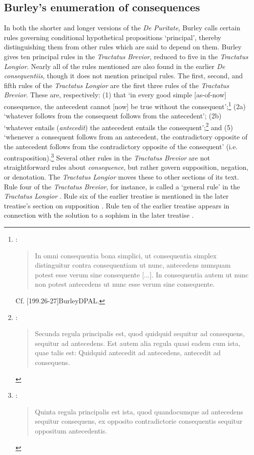 \documentclass[]{birkjour}
\begin{document}
\subsection{Burley's enumeration of consequences}
In both the shorter and longer versions of the \textit{De Puritate}, Burley calls certain rules governing conditional hypothetical propositions `principal', thereby distinguishing them from other rules which are said to depend on them. Burley gives ten principal rules in the \textit{Tractatus Brevior}, reduced to five in the \textit{Tractatus Longior}. Nearly all of the rules mentioned are also found in the earlier \textit{De consequentiis}, though it does not mention principal rules. The first, second, and fifth rules of the \textit{Tractatus Longior} are the first three rules of the \textit{Tractatus Brevior}. These are, respectively: (1) that `in every good simple [as-of-now] consequence, the antecedent cannot [now] be true without the consequent';\footnote{\autocite[p. 61.30-37, 199.26-27]{BurleyDPAL}: \begin{quote}
		{In omni consequentia bona simplici, ut consequentia simplex distinguitur contra consequentiam ut nunc, antecedens numquam potest esse verum sine consequente [...]. In consequentia autem ut nunc non potest antecedens ut nunc esse verum sine consequente.}
	\end{quote} Cf. [199.26-27]{BurleyDPAL}.}  (2a) `whatever follows from the consequent follows from the antecedent'; (2b) `whatever entails (\textit{antecedit}) the antecedent entails the consequent';\footnote{\autocite[p. 62, 9-13]{BurleyDPAL}: \begin{quote}
	Secunda regula principalis est, quod quidquid sequitur ad consequens, sequitur ad antecedens. Est autem alia regula quasi eadem cum ista, quae talis est: Quidquid antecedit ad antecedens, antecedit ad consequens.
\end{quote}} and (5) `whenever a consequent follows from an antecedent, the contradictory opposite of the antecedent follows from the contradictory opposite of the consequent' (i.e. contraposition).\footnote{\autocite[p. 64.20-22]{BurleyDPAL}: \begin{quote}
Quinta regula principalis est ista, quod quandocumque ad antecedens sequitur consequens, ex opposito contradictorie consequentis sequitur oppositum antecedentis.
\end{quote}} Several other rules in the \textit{Tractatus Brevior} are not straightforward rules about \textit{consequence}, but rather govern supposition, negation, or denotation. The \textit{Tractatus Longior} moves these to other sections of its text. Rule four of the \textit{Tractatus Brevior}, for instance, is called a `general rule' in the \textit{Tractatus Longior} \autocite[p. 208.12-13, p. 73.29]{BurleyDPAL}. Rule six of the earlier treatise is mentioned in the later treatise's section on supposition \autocite[p. 210.11-12, p. 27.11]{BurleyDPAL}. Rule ten of the earlier treatise appears in connection with the solution to a sophism in the later treatise \autocite[p. 219.1-2, p. 141.26-30]{BurleyDPAL}. 
\end{document}
